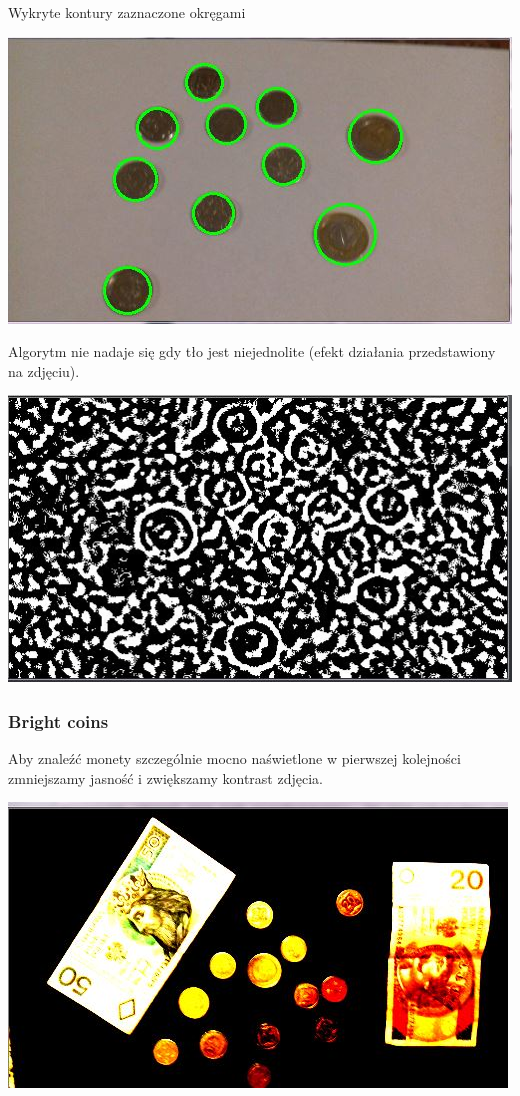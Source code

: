 \documentclass[12pt]{article}
\begin{document}
Wykryte kontury zaznaczone okręgami

\includegraphics[scale=0.4]{AdaptiveTResult}

Algorytm nie nadaje się gdy tło jest niejednolite (efekt działania przedstawiony na zdjęciu).

\includegraphics[scale=0.4]{AdaptiveTBad}
\newpage
\subsubsection*{Bright coins}
Aby znaleźć monety szczególnie mocno naświetlone w pierwszej kolejności zmniejszamy jasność i zwiększamy kontrast zdjęcia.

\includegraphics[scale=0.4]{BrightC}
\end{document}
